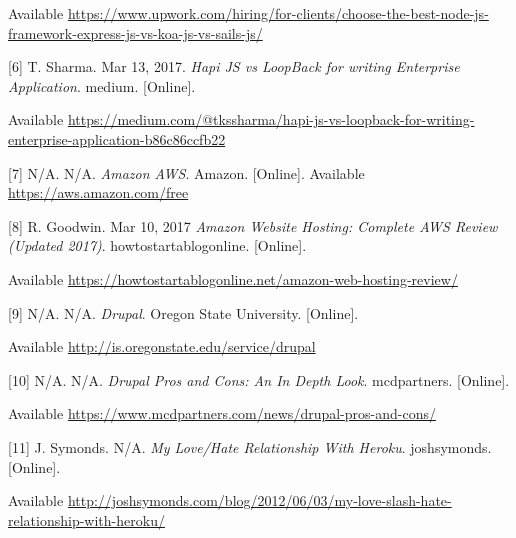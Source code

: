 Available \url{https://www.upwork.com/hiring/for-clients/choose-the-best-node-js-framework-express-js-vs-koa-js-vs-sails-js/}

[6] T. Sharma. Mar 13, 2017. \textit{Hapi JS vs LoopBack for writing Enterprise Application}. medium. [Online]. 

Available \url{https://medium.com/@tkssharma/hapi-js-vs-loopback-for-writing-enterprise-application-b86c86ccfb22}

[7] N/A. N/A. \textit{Amazon AWS}. Amazon. [Online]. Available \url{https://aws.amazon.com/free}

[8] R. Goodwin. Mar 10, 2017 \textit{Amazon Website Hosting: Complete AWS Review (Updated 2017)}. howtostartablogonline. [Online]. 

Available \url{https://howtostartablogonline.net/amazon-web-hosting-review/}

[9] N/A. N/A. \textit{ Drupal}. Oregon State University. [Online]. 

Available \url{http://is.oregonstate.edu/service/drupal}

[10] N/A. N/A. \textit{Drupal Pros and Cons: An In Depth Look}. mcdpartners. [Online]. 

Available \url{https://www.mcdpartners.com/news/drupal-pros-and-cons/}

[11] J. Symonds. N/A. \textit{My Love/Hate Relationship With Heroku}. joshsymonds. [Online]. 

Available \url{http://joshsymonds.com/blog/2012/06/03/my-love-slash-hate-relationship-with-heroku/}




